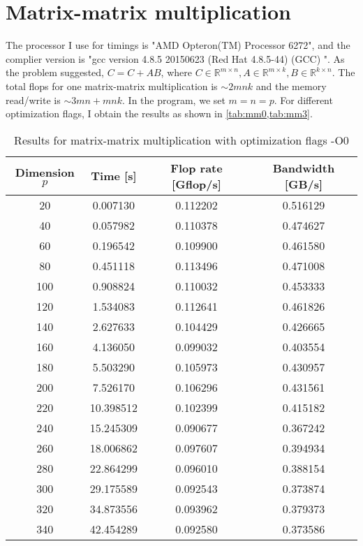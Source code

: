 \documentclass[10pt,a4paper]{article}
\theoremstyle{dotlessP}
\def\RR{\mathbb{R}}
\begin{document}
\section{Matrix-matrix multiplication}
The processor I use for timings is "AMD Opteron(TM) Processor 6272", and the complier version is "gcc version 4.8.5 20150623 (Red Hat 4.8.5-44) (GCC) ". As the problem suggested, $C=C+AB$, where $C\in \RR^{m\times n}, A\in \RR^{m\times k}, B \in\RR^{k \times n}$. The total flops for one matrix-matrix multiplication is $\sim 2mnk$ and the memory read/write is $\sim 3mn+mnk$. In the program, we set $m=n=p$. For different optimization flags, I obtain the results as shown in \cref{tab:mm0,tab:mm3}.

	\begin{table}[tbhp] 
	{\footnotesize
		\caption{Results for matrix-matrix multiplication with optimization flags -O0
		}\label{tab:mm0}
		\begin{center}
			\begin{tabular}{cccc}
				\hline 
				Dimension  $p$ &    Time [s] &  Flop rate [Gflop/s]     & Bandwidth  [GB/s] \\ 
				\hline 
        20 &   0.007130 &    0.112202 &   0.516129 \\ 
40 &   0.057982 &    0.110378 &   0.474627 \\ 
60 &   0.196542 &    0.109900 &   0.461580 \\ 
80 &   0.451118 &    0.113496 &   0.471008 \\ 
100 &   0.908824 &    0.110032 &   0.453333 \\ 
120 &   1.534083 &    0.112641 &   0.461826 \\ 
140 &   2.627633 &    0.104429 &   0.426665 \\ 
160 &   4.136050 &    0.099032 &   0.403554 \\ 
180 &   5.503290 &    0.105973 &   0.430957 \\ 
200 &   7.526170 &    0.106296 &   0.431561 \\ 
220 &  10.398512 &    0.102399 &   0.415182 \\ 
240 &  15.245309 &    0.090677 &   0.367242 \\ 
260 &  18.006862 &    0.097607 &   0.394934 \\ 
280 &  22.864299 &    0.096010 &   0.388154 \\ 
300 &  29.175589 &    0.092543 &   0.373874 \\ 
320 &  34.873556 &    0.093962 &   0.379373 \\ 
340 &  42.454289 &    0.092580 &   0.373586 \\ 

\end{tabular}
\end{center}}
\end{table}
\end{document}
